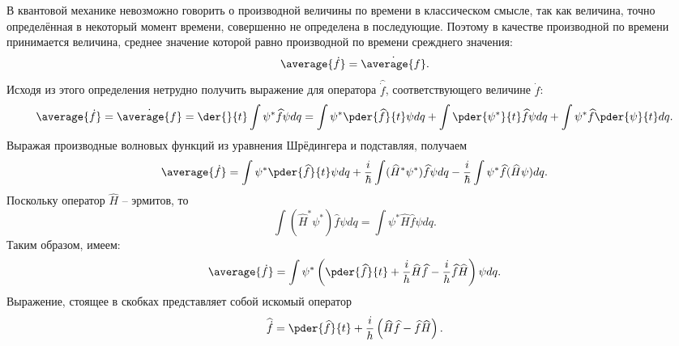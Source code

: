 
В квантовой механике невозможно говорить о производной величины по времени в
классическом смысле, так как величина, точно определённая в некоторый момент
времени, совершенно не определена в последующие. Поэтому в качестве производной
по времени принимается величина, среднее значение которой равно производной
по времени срежднего значения:
\[
    \average{\dot{f}} = \dot{\average{f}}.
\]
Исходя из этого определения нетрудно получить выражение для оператора
\( \hat{\dot{f}} \), соответствующего величине \( \dot{f} \):
\[
    \average{\dot{f}} = \dot{\average{f}} = \der{}{t}\int\psi^*\hat{f}\psi dq =
    \int\psi^*\pder{\hat{f}}{t}\psi dq + \int\pder{\psi^*}{t}\hat{f}\psi dq +
    \int\psi^*\hat{f}\pder{\psi}{t} dq.
\]
Выражая производные волновых функций из уравнения Шрёдингера и подставляя,
получаем
\[
    \average{\dot{f}} =  \int\psi^*\pder{\hat{f}}{t}\psi dq
    +\frac{i}{\hbar}  \int(\hat{H}^*\psi^*)\hat{f}\psi dq -
    \frac{i}{\hbar} \int\psi^*\hat{f}(\hat{H}\psi) dq.
\]
Поскольку оператор \( \hat{H} \) -- эрмитов, то
\[
    \int(\hat{H}^*\psi^*)\hat{f}\psi dq = \int \psi^*\hat{H}\hat{f}\psi dq. 
\]
Таким образом, имеем:
\[
    \average{\dot{f}} =  \int\psi^*\left(\pder{\hat{f}}{t} +
    \frac{i}{h}\hat{H}\hat{f} - \frac{i}{h}\hat{f}\hat{H} \right)\psi dq.
\]
Выражение, стоящее в скобках представляет собой искомый оператор
\[
    \hat{\dot{f}} = \pder{\hat{f}}{t} +
    \frac{i}{h}\left(\hat{H}\hat{f} - \hat{f}\hat{H}\right).
\]

